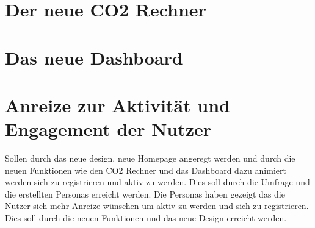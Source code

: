 \section{Der neue CO2 Rechner}


\section{Das neue Dashboard}


\section{Anreize zur Aktivität und Engagement der Nutzer}


Sollen durch das neue design, neue Homepage angeregt werden und durch die neuen Funktionen wie den CO2 Rechner und das Dashboard dazu animiert werden sich zu registrieren und aktiv zu werden. Dies soll durch die Umfrage und die erstellten Personas erreicht werden. Die Personas haben gezeigt das die Nutzer sich mehr Anreize wünschen um aktiv zu werden und sich zu registrieren. Dies soll durch die neuen Funktionen und das neue Design erreicht werden.
